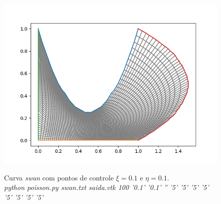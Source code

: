 \documentclass[a4paper]{article}
\begin{document}


\begin{figure}[ht]
	\centering
	\includegraphics[width=1.0\textwidth]{swan_0,1_0,1.png}
	\label{fig:swan} 
	\caption[caption]{Curva \textit{swan} com pontos de controle $\xi=0.1$ e $\eta=0.1$. \\\hspace{\textwidth} \textit{python poisson.py swan.txt saida.vtk 100 '0.1' '0.1' '' '5' '5' '5' '5' '5' '5' '5' '5'}}
\end{figure}
\end{document}
